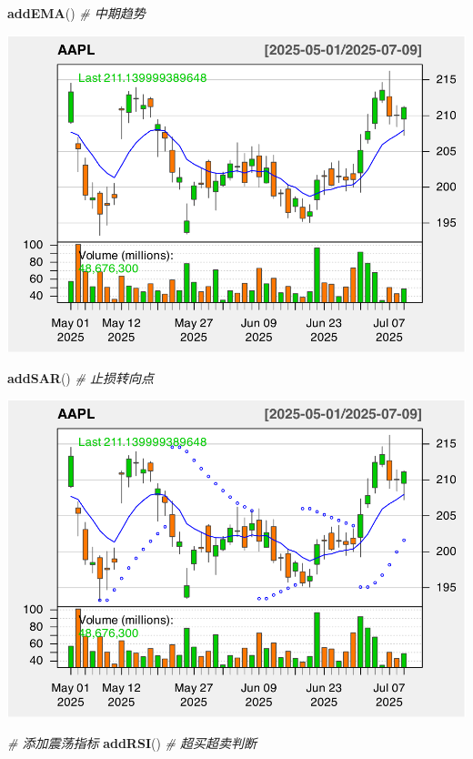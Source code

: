 \documentclass[]{ctexbook}
\newenvironment{Shaded}{\begin{snugshade}}{\end{snugshade}}
\newcommand{\CommentTok}[1]{\textcolor[rgb]{0.56,0.35,0.01}{\textit{#1}}}
\newcommand{\FunctionTok}[1]{\textcolor[rgb]{0.13,0.29,0.53}{\textbf{#1}}}
\newcommand{\NormalTok}[1]{#1}
\begin{document}
\begin{Shaded}
\begin{Highlighting}[]
\FunctionTok{addEMA}\NormalTok{()  }\CommentTok{\# 中期趋势}
\end{Highlighting}
\end{Shaded}

\includegraphics[width=0.9\linewidth]{quantmod_files/figure-latex/comprehensive-3}

\begin{Shaded}
\begin{Highlighting}[]
\FunctionTok{addSAR}\NormalTok{()  }\CommentTok{\# 止损转向点}
\end{Highlighting}
\end{Shaded}

\includegraphics[width=0.9\linewidth]{quantmod_files/figure-latex/comprehensive-4}

\begin{Shaded}
\begin{Highlighting}[]
\CommentTok{\# 添加震荡指标}
\FunctionTok{addRSI}\NormalTok{()  }\CommentTok{\# 超买超卖判断}
\end{Highlighting}
\end{Shaded}
\end{document}
